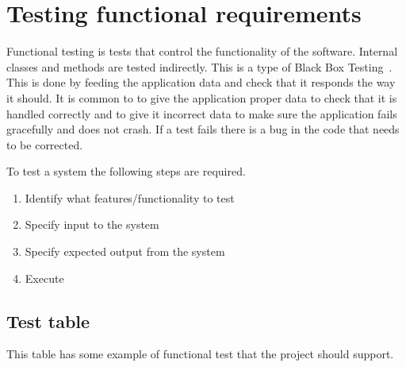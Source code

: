 \section{Testing functional requirements}
\label{sec:funcTest}
Functional testing is tests that control the functionality of the software. Internal classes and methods are tested indirectly. This is a type of Black Box Testing~\cite{blackbox}. This is done by feeding the application data and check that it responds the way it should. It is common to to give the application proper data to check that it is handled correctly and to give it incorrect data to make sure the application fails gracefully and does not crash. If a test fails there is a bug in the code that needs to be corrected.

To test a system the following steps are required.
\begin{enumerate}
\item Identify what features/functionality to test
\item Specify input to the system
\item Specify expected output from the system
\item Execute
\end{enumerate}

\subsection{Test table}
This table has some example of functional test that the project should support.

